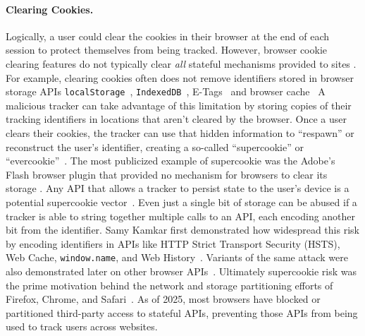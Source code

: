 \paragraph{Clearing Cookies.}
Logically, a user could clear the cookies in their browser at the end of each session to protect themselves from being tracked. 
%
However, browser cookie clearing features do not typically clear \textit{all} stateful mechanisms provided to sites \cite{acarWebNeverForgets2014, englehardtOnlineTracking1millionsite2016}. 
%
For example, clearing cookies often does not remove identifiers stored in browser storage APIs \texttt{localStorage}~\cite{ayensonFlashCookiesPrivacy2011,roesnerDetectingDefendingThirdparty2012}, \texttt{IndexedDB}~\cite{acarFPDetectiveDustingWeb2013}, E-Tags~\cite{ayensonFlashCookiesPrivacy2011} and browser cache~\cite{sorensenZombiecookiesCaseStudies2013}
%
A malicious tracker can take advantage of this limitation by storing copies of their tracking identifiers in locations that aren’t cleared by the browser. 
%
Once a user clears their cookies, the tracker can use that hidden information to ``respawn'' or reconstruct the user’s identifier, creating a so-called ``supercookie'' or ``evercookie''~\cite{ayensonFlashCookiesPrivacy2011,soltaniFlashCookiesPrivacy2009,fouadMyCookiePhoenix2022}.
%
The most publicized example of supercookie was the Adobe's Flash browser plugin that provided no mechanism for browsers to clear its storage \cite{soltaniFlashCookiesPrivacy2009,solomosTalesFaviconsCaches2021}.
%
Any API that allows a tracker to persist state to the user’s device is a potential supercookie vector~\cite{aliNavigatingMurkyWaters2023}. 
%
Even just a single bit of storage can be abused if a tracker is able to string together multiple calls to an API, each encoding another bit from the identifier. 
%
Samy Kamkar first demonstrated how widespread this risk by encoding identifiers in APIs like HTTP Strict Transport Security (HSTS), Web Cache, \texttt{window.name}, and Web History~\cite{kamkarSamyKamkarEvercookie2010}. 
%
Variants of the same attack were also demonstrated later on other browser APIs~\cite{klink1334485TrackingUsing2017,goodinUnpatchedBrowserWeaknesses2015,evansPublicKeyPinning2015}. 
%
Ultimately supercookie risk was the prime motivation behind the network and storage partitioning efforts of Firefox, Chrome, and Safari~\cite{menkeStorageIsolationProject2020,privacycommunitygroupClientSideStoragePartitioning2022,mdnStatePartitioningPrivacy2024}. 
%
As of 2025, most browsers have blocked or partitioned third-party access to stateful APIs, preventing those APIs from being used to track users across websites.

